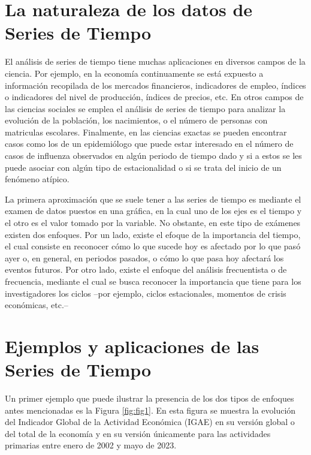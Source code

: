 \documentclass[
]{book}
\begin{document}
\hypertarget{la-naturaleza-de-los-datos-de-series-de-tiempo}{%
\section{La naturaleza de los datos de Series de Tiempo}\label{la-naturaleza-de-los-datos-de-series-de-tiempo}}

El análisis de series de tiempo tiene muchas aplicaciones en diversos campos de la ciencia. Por ejemplo, en la economía continuamente se está expuesto a información recopilada de los mercados financieros, indicadores de empleo, índices o indicadores del nivel de producción, índices de precios, etc. En otros campos de las ciencias sociales se emplea el análisis de series de tiempo para analizar la evolución de la población, los nacimientos, o el número de personas con matriculas escolares. Finalmente, en las ciencias exactas se pueden encontrar casos como los de un epidemiólogo que puede estar interesado en el número de casos de influenza observados en algún periodo de tiempo dado y si a estos se les puede asociar con algún tipo de estacionalidad o si se trata del inicio de un fenómeno atípico.

La primera aproximación que se suele tener a las series de tiempo es mediante el examen de datos puestos en una gráfica, en la cual uno de los ejes es el tiempo y el otro es el valor tomado por la variable. No obstante, en este tipo de exámenes existen dos enfoques. Por un lado, existe el efoque de la importancia del tiempo, el cual consiste en reconocer cómo lo que sucede hoy es afectado por lo que pasó ayer o, en general, en periodos pasados, o cómo lo que pasa hoy afectará los eventos futuros. Por otro lado, existe el enfoque del análisis frecuentista o de frecuencia, mediante el cual se busca reconocer la importancia que tiene para los investigadores los ciclos --por ejemplo, ciclos estacionales, momentos de crisis económicas, etc.--

\hypertarget{ejemplos-y-aplicaciones-de-las-series-de-tiempo}{%
\section{Ejemplos y aplicaciones de las Series de Tiempo}\label{ejemplos-y-aplicaciones-de-las-series-de-tiempo}}

Un primer ejemplo que puede ilustrar la presencia de los dos tipos de
enfoques antes mencionadas es la Figura \ref{fig:fig1}. En esta figura se muestra la evolución del Indicador Global de la Actividad Económica (IGAE) en su versión global o del total de la economía y en su versión únicamente para las actividades primarias entre enero de 2002 y mayo de 2023.
\end{document}
